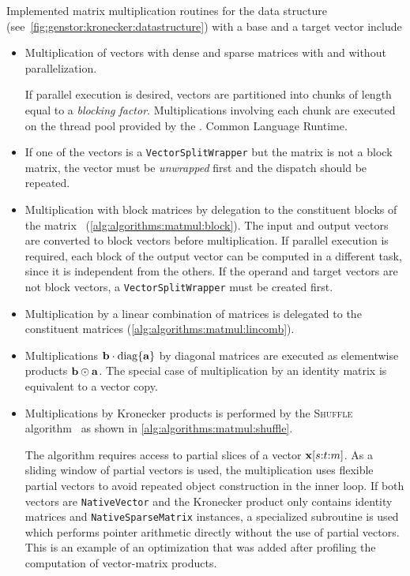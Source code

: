 Implemented matrix multiplication routines for the data structure
(see~\vref{fig:genstor:kronecker:datastructure}) with a base and a
target vector include
\begin{itemize}
\item Multiplication of vectors with dense and sparse matrices with
  and without parallelization.

  If parallel execution is desired, vectors are partitioned into
  chunks of length equal to a \emph{blocking factor}. Multiplications
  involving each chunk are executed on the thread pool provided by the
  . Common Language Runtime.
\item If one of the vectors is a \texttt{VectorSplitWrapper} but the
  matrix is not a block matrix, the vector must be \emph{unwrapped}
  first and the dispatch should be repeated.
\item Multiplication with block matrices by delegation to the
  constituent blocks of the matrix%
  ~(\vref{alg:algorithms:matmul:block}). The input and output vectors
  are converted to block vectors before multiplication. If parallel
  execution is required, each block of the output vector can be
  computed in a different task, since it is independent from the
  others. If the operand and target vectors are not block vectors, a
  \texttt{VectorSplitWrapper} must be created first.
\item Multiplication by a linear combination of matrices is delegated
  to the constituent matrices (\vref{alg:algorithms:matmul:lincomb}).
\item Multiplications $\bm{\mathrm{b}} \cdot \operatorname{diag}\{\bm{\mathrm{a}}\}$ by diagonal
  matrices are executed as elementwise products
  $\bm{\mathrm{b}} \odot \bm{\mathrm{a}}$. The special case of multiplication by an
  identity matrix is equivalent to a vector copy.
\item Multiplications by Kronecker products is performed by the
  \textsc{Shuffle} algorithm~%
  \citep{DBLP:journals/informs/BuchholzCDK00,benoit2001memory} as
  shown in \vref{alg:algorithms:matmul:shuffle}.

  The algorithm requires access to partial slices of a vector
  $\bm{\mathrm{x}}[s{:}t{:}m]$. As a sliding window of partial vectors is
  used, the multiplication uses flexible partial vectors to avoid
  repeated object construction in the inner loop. If both vectors are
  \texttt{NativeVector} and the Kronecker product only contains
  identity matrices and \texttt{NativeSparseMatrix} instances, a
  specialized subroutine is used which performs pointer arithmetic
  directly without the use of partial vectors. This is an example of
  an optimization that was added after profiling the computation of
  vector-matrix products.


\end{itemize}
